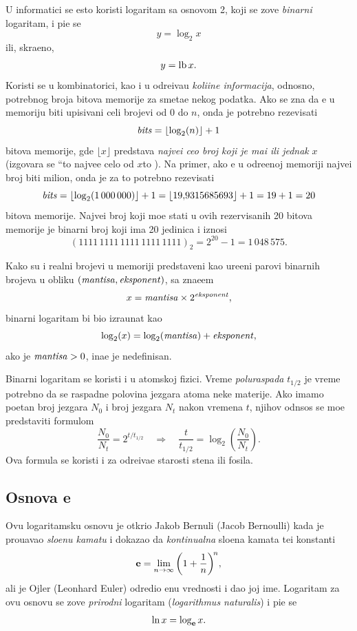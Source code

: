 \documentclass[12pt, twoside, a4paper]{article}
\def\navod#1{\leavevmode\setbox\qqbox\hbox{``}\hbox to \wd\qqbox{,\hss,}#1\hbox to \wd\qqbox{`\hss`}}
\def\logtwo{\log_2}
\def\puta{\times}
\def\.{\smash{,}\vphantom{.}}
\def\e{{\bf e}}
\def\th{t_{1/2}}
\def\sledi{{\quad\Rightarrow\quad}}
\begin{document}
U informatici se {\cv}esto koristi logaritam sa osnovom 2, koji se zove {\sl binarni\/} logaritam,
i pi{\sv}e se
$$
y=\logtwo x
$$
ili, skra{\cc}eno,
$$
y=\mathop{\rm lb} x.
$$
Koristi se u kombinatorici, kao i u odre{\dj}iva{\nj}u {\sl koli{\cv}ine informacija},
odnosno, potrebnog broja bitova me\-mo\-ri\-je za sme{\sv}ta{\nj}e nekog podatka.
Ako se zna da {\cc}e u me\-mo\-ri\-ju biti upisivani celi brojevi od 0 do $n$, onda je potrebno rezevisati
\begin{equation}\label{eq:bits}
  \bits = \lfloor\logtwo(n)\rfloor+1
\end{equation}
bitova memorije, gde $\lfloor x\rfloor$ predstav{\lj}a {\sl najve{\cc}i ceo broj koji je ma{\nj}i ili jednak} $x$
(izgovara se \navod{najve{\cc}e celo od $x$}). 
Na primer, ako {\cc}e u odre{\dj}enoj memoriji najve{\cc}i 
broj biti milion, onda je za to potrebno rezevisati
$$
\bits=\lfloor\logtwo(1\,000\,000)\rfloor+1=\lfloor 19\.9315685693\rfloor+1 = 19+1=20
$$
bitova memorije. Najve{\cc}i broj koji mo{\zv}e stati u ovih rezervisanih 20 bitova memorije je binarni broj koji ima 20 jedinica
i iznosi 
$$
(1111\,1111\,1111\,1111\,1111)_2=
2^{20}-1=1\,048\,575.
$$

Kako su i realni brojevi u memoriji predstav{\lj}eni kao ure{\dj}eni parovi binarnih brojeva u obliku
$({\it mantisa},{\it eksponent})$, sa zna{\cv}e{\nj}em
$$
x=\mant\puta2^\expo,
$$
binarni logaritam bi bio izra{\cv}unat kao
$$
\logtwo(x)=\logtwo(\mant)+\expo,
$$
ako je ${\it mantisa}>0$, ina{\cv}e je nedefinisan.

\smallskip

Binarni logaritam se koristi i u atomskoj fizici.
Vreme {\sl poluraspada\/} $\th$ je vreme potrebno da se raspadne polovina jezgara atoma neke materije. 
Ako imamo po{\cv}etan broj jezgara $N_0$ i broj jezgara $N_t$ nakon vremena $t$, njihov odnsos
se mo{\zv}e pred\-sta\-vi\-ti formulom
\begin{equation}
\label{eq:halftime}
\frac{N_0}{N_t}=2^{t/\th}\sledi \frac{t}{\th}=\logtwo\left( \frac{N_0}{N_t} \right).
\end{equation}
Ova formula se koristi i za odre{\dj}iva{\nj}e starosti stena ili fosila.



\subsection{Osnova \e}

Ovu logaritamsku osnovu je otkrio Jakob Bernuli (Jacob Bernoulli) kada je
prou{\cv}avao {\sl slo{\zv}enu kamatu\/} i dokazao da {\sl kontinualna\/} slo{\zv}ena kamata
te{\zv}i konstanti
$$
\e=\lim_{n\to\infty}\left(1+\frac1n\right)^{\!n}\!,
$$
ali je Ojler (Leonhard Euler)
odredio {\nj}enu vrednosti i dao joj ime.
Logaritam za ovu osnovu se zove {\sl prirodni\/} logaritam ({\sl logarithmus naturalis\/})
i pi{\sv}e se
$$
\ln x=\log_\e x.
$$
\end{document}
